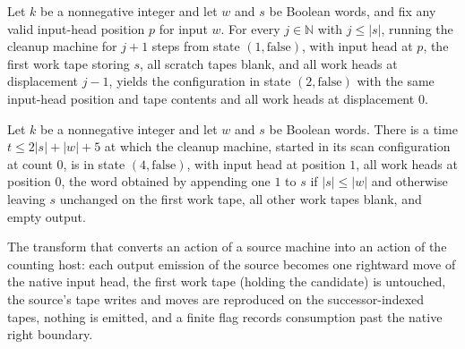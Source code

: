 \begin{lemma}
\label{Turing.FinTM.splitRestore_rewind}
\leanok
{}
Let $k$ be a nonnegative integer and let $w$ and $s$ be Boolean words, and fix any valid
input-head position $p$ for input $w$. For every $j\in\mathbb N$ with $j\le |s|$,
running the cleanup machine for $j+1$ steps from state $(1,\mathrm{false})$, with input
head at $p$, the first work tape storing $s$, all scratch tapes blank, and all work
heads at displacement $j-1$, yields the configuration in state $(2,\mathrm{false})$ with
the same input-head position and tape contents and all work heads at displacement $0$.
\end{lemma}

\begin{lemma}
\label{Turing.FinTM.splitRestore_run}
\leanok
{}
Let $k$ be a nonnegative integer and let $w$ and $s$ be Boolean words. There is a time
$t\le 2|s|+|w|+5$ at which the cleanup machine, started in its scan configuration at
count $0$, is in state $(4,\mathrm{false})$, with input head at position $1$, all work
heads at position $0$, the word obtained by appending one $1$ to $s$ if $|s|\le |w|$ and
otherwise leaving $s$ unchanged on the first work tape, all other work tapes blank, and
empty output.
\end{lemma}

\begin{definition}
\label{Turing.FinTM.splitCountAction}
\leanok
{}
The transform that converts an action of a source machine into an action of
the counting host: each output emission of the source becomes one rightward
move of the native input head, the first work tape (holding the candidate) is
untouched, the source's tape writes and moves are reproduced on the
successor-indexed tapes, nothing is emitted, and a finite flag records
consumption past the native right boundary.
\end{definition}

